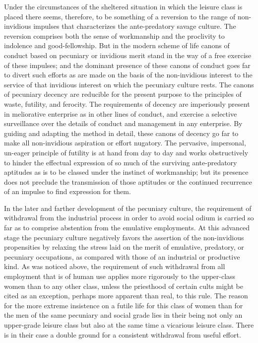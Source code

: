 \documentclass[12pt]{report}
\begin{document}
Under the circumstances of the sheltered situation in which the leisure
class is placed there seems, therefore, to be something of a reversion
to the range of non-invidious impulses that characterizes the
ante-predatory savage culture. The reversion comprises both the sense of
workmanship and the proclivity to indolence and good-fellowship. But
in the modern scheme of life canons of conduct based on pecuniary or
invidious merit stand in the way of a free exercise of these impulses;
and the dominant presence of these canons of conduct goes far to divert
such efforts as are made on the basis of the non-invidious interest to
the service of that invidious interest on which the pecuniary culture
rests. The canons of pecuniary decency are reducible for the present
purpose to the principles of waste, futility, and ferocity. The
requirements of decency are imperiously present in meliorative
enterprise as in other lines of conduct, and exercise a selective
surveillance over the details of conduct and management in any
enterprise. By guiding and adapting the method in detail, these canons
of decency go far to make all non-invidious aspiration or effort
nugatory. The pervasive, impersonal, un-eager principle of futility is
at hand from day to day and works obstructively to hinder the effectual
expression of so much of the surviving ante-predatory aptitudes as is to
be classed under the instinct of workmanship; but its presence does not
preclude the transmission of those aptitudes or the continued recurrence
of an impulse to find expression for them.

In the later and farther development of the pecuniary culture, the
requirement of withdrawal from the industrial process in order to
avoid social odium is carried so far as to comprise abstention from
the emulative employments. At this advanced stage the pecuniary culture
negatively favors the assertion of the non-invidious propensities
by relaxing the stress laid on the merit of emulative, predatory,
or pecuniary occupations, as compared with those of an industrial
or productive kind. As was noticed above, the requirement of such
withdrawal from all employment that is of human use applies more
rigorously to the upper-class women than to any other class, unless the
priesthood of certain cults might be cited as an exception, perhaps
more apparent than real, to this rule. The reason for the more extreme
insistence on a futile life for this class of women than for the men
of the same pecuniary and social grade lies in their being not only an
upper-grade leisure class but also at the same time a vicarious
leisure class. There is in their case a double ground for a consistent
withdrawal from useful effort.
\end{document}
